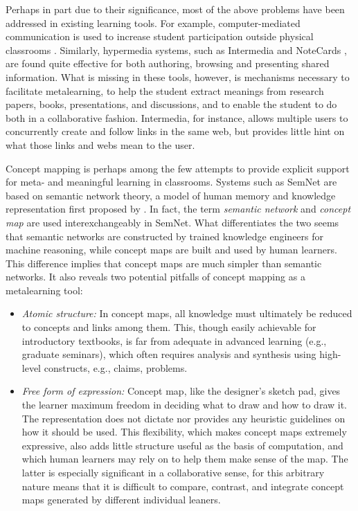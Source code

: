 Perhaps in part due to their significance, most of the above problems have
been addressed in existing learning tools. For example, computer-mediated
communication is used to increase student participation outside physical
classrooms \cite{HILTZ88Collaborative}. Similarly, hypermedia systems, such
as Intermedia \cite{Yankelovich88} and NoteCards \cite{Halasz87NOTECARDS},
are found quite effective for both authoring, browsing and presenting
shared information. What is missing in these tools, however, is mechanisms
necessary to facilitate metalearning, to help the student extract meanings
from research papers, books, presentations, and discussions, and to enable
the student to do both in a collaborative fashion. Intermedia, for
instance, allows multiple users to concurrently create and follow links in
the same web, but provides little hint on what those links and webs mean to
the user.

Concept mapping is perhaps among the few attempts to provide explicit
support for meta- and meaningful learning \cite{Novak84} in classrooms.
Systems such as SemNet \cite{Fisher90} are based on semantic network
theory, a model of human memory and knowledge representation first proposed
by \cite{Quilian67}. In fact, the term {\it semantic network\/} and {\it
concept map\/} are used interexchangeably in SemNet. What differentiates
the two seems that semantic networks are constructed by trained knowledge
engineers for machine reasoning, while concept maps are built and used by
human learners. This difference implies that concept maps are much simpler
than semantic networks. It also reveals two potential pitfalls of concept
mapping as a metalearning tool:

\begin{itemize}
\item {\it Atomic structure:\/} In concept maps, all knowledge must
  ultimately be reduced to concepts and links among them.  This, though
  easily achievable for introductory textbooks, is far from adequate in
  advanced learning (e.g., graduate seminars), which often requires analysis
  and synthesis using high-level constructs, e.g., claims, problems.
  
\item {\it Free form of expression:\/} Concept map, like the designer's
  sketch pad, gives the learner maximum freedom in deciding what to draw
  and how to draw it. The representation does not dictate nor provides any
  heuristic guidelines on how it should be used. This flexibility, which
  makes concept maps extremely expressive, also adds little structure
  useful as the basis of computation, and which human learners may rely on
  to help them make sense of the map. The latter is especially significant
  in a collaborative sense, for this arbitrary nature means that it is
  difficult to compare, contrast, and integrate concept maps generated by
  different individual leaners.
\end{itemize}

